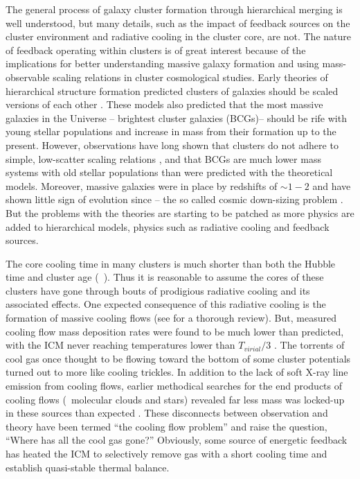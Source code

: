 \documentclass{emulateapj}
\begin{document}
The general process of galaxy cluster formation through hierarchical
merging is well understood, but many details, such as the impact of
feedback sources on the cluster environment and radiative cooling in
the cluster core, are not. The nature of feedback operating within
clusters is of great interest because of the implications for better
understanding massive galaxy formation and using mass-observable
scaling relations in cluster cosmological studies. Early theories of
hierarchical structure formation predicted clusters of galaxies should
be scaled versions of each other \citep{kaiser86, 1996ApJ...469..494E,
1997MNRAS.292..289E}. These models also predicted that the most
massive galaxies in the Universe -- brightest cluster galaxies
(BCGs)-- should be rife with young stellar populations and increase in
mass from their formation up to the present. However, observations
have long shown that clusters do not adhere to simple, low-scatter
scaling relations \citep{edge91, 1999ApJ...520...78H,
2000ApJ...536...73N, 2001A&A...368..749F}, and that BCGs are much
lower mass systems with old stellar populations than were predicted
with the theoretical models. Moreover, massive galaxies were in place
by redshifts of $\sim 1-2$ \citep{1996MNRAS.283.1388M,
1996Natur.384..439S} and have shown little sign of evolution since --
the so called cosmic down-sizing problem
\citep{1996AJ....112..839C}. But the problems with the theories
are starting to be patched as more physics are added to hierarchical
models, physics such as radiative cooling and feedback sources.

The core cooling time in many clusters is much shorter than both the
Hubble time and cluster age (\eg\ \citealt{1998MNRAS.298..416P}). Thus
it is reasonable to assume the cores of these clusters have gone
through bouts of prodigious radiative cooling and its associated
effects. One expected consequence of this radiative cooling is the
formation of massive cooling flows (see \citealt{fabiancfreview} for a
thorough review). But, measured cooling flow mass deposition rates
were found to be much lower than predicted, with the ICM never
reaching temperatures lower than $T_{virial}/3$ \citep{tamura01,
peterson01, peterson03}. The torrents of cool gas once thought to be
flowing toward the bottom of some cluster potentials turned out to
more like cooling trickles. In addition to the lack of soft X-ray line
emission from cooling flows, earlier methodical searches for the end
products of cooling flows (\ie\ molecular clouds and stars) revealed
far less mass was locked-up in these sources than expected
\citep{heckman89, mcnamara90, odea94, voit95}. These disconnects between
observation and theory have been termed ``the cooling flow problem''
and raise the question, ``Where has all the cool gas gone?''
Obviously, some source of energetic feedback has heated the ICM to
selectively remove gas with a short cooling time and establish
quasi-stable thermal balance.
\end{document}
